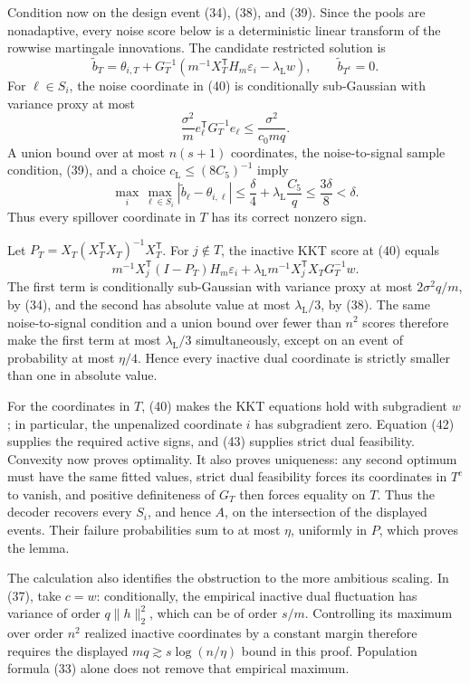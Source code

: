 Condition now on the design event (34), (38), and (39).  Since the pools are nonadaptive, every noise score below is a deterministic linear transform of the rowwise martingale innovations.  The candidate restricted solution is
\[
 \widetilde b_T=\theta_{i,T}
 +G_T^{-1}\left(m^{-1}X_T^{\mathsf T}H_m\varepsilon_i
                    -\lambda_{\mathrm L}w\right),
 \qquad \widetilde b_{T^c}=0.
 \tag{40}
\]
For \(\ell\in S_i\), the noise coordinate in (40) is conditionally sub-Gaussian with variance proxy at most
\[
 \frac{\sigma^2}{m}e_\ell^{\mathsf T}G_T^{-1}e_\ell
 \le\frac{\sigma^2}{c_0mq}.
 \tag{41}
\]
A union bound over at most \(n(s+1)\) coordinates, the noise-to-signal sample condition, (39), and a choice \(c_{\mathrm L}\le(8C_5)^{-1}\) imply
\[
 \max_{i}\max_{\ell\in S_i}|\widetilde b_\ell-\theta_{i,\ell}|
 \le\frac\delta4+\lambda_{\mathrm L}\frac{C_5}{q}
 \le\frac{3\delta}{8}<\delta.
 \tag{42}
\]
Thus every spillover coordinate in \(T\) has its correct nonzero sign.

Let \(P_T=X_T(X_T^{\mathsf T}X_T)^{-1}X_T^{\mathsf T}\).  For \(j\notin T\), the inactive KKT score at (40) equals
\[
 m^{-1}X_j^{\mathsf T}(I-P_T)H_m\varepsilon_i
 +\lambda_{\mathrm L}m^{-1}X_j^{\mathsf T}X_TG_T^{-1}w.
 \tag{43}
\]
The first term is conditionally sub-Gaussian with variance proxy at most \(2\sigma^2q/m\), by (34), and the second has absolute value at most \(\lambda_{\mathrm L}/3\), by (38).  The same noise-to-signal condition and a union bound over fewer than \(n^2\) scores therefore make the first term at most \(\lambda_{\mathrm L}/3\) simultaneously, except on an event of probability at most \(\eta/4\).  Hence every inactive dual coordinate is strictly smaller than one in absolute value.

For the coordinates in \(T\), (40) makes the KKT equations hold with subgradient \(w\); in particular, the unpenalized coordinate \(i\) has subgradient zero.  Equation (42) supplies the required active signs, and (43) supplies strict dual feasibility.  Convexity now proves optimality.  It also proves uniqueness: any second optimum must have the same fitted values, strict dual feasibility forces its coordinates in \(T^c\) to vanish, and positive definiteness of \(G_T\) then forces equality on \(T\).  Thus the decoder recovers every \(S_i\), and hence \(A\), on the intersection of the displayed events.  Their failure probabilities sum to at most \(\eta\), uniformly in \(P\), which proves the lemma.

The calculation also identifies the obstruction to the more ambitious scaling.  In (37), take \(c=w\): conditionally, the empirical inactive dual fluctuation has variance of order \(q\lVert h\rVert_2^2\), which can be of order \(s/m\).  Controlling its maximum over order \(n^2\) realized inactive coordinates by a constant margin therefore requires the displayed \(mq\gtrsim s\log(n/\eta)\) bound in this proof.  Population formula (33) alone does not remove that empirical maximum.